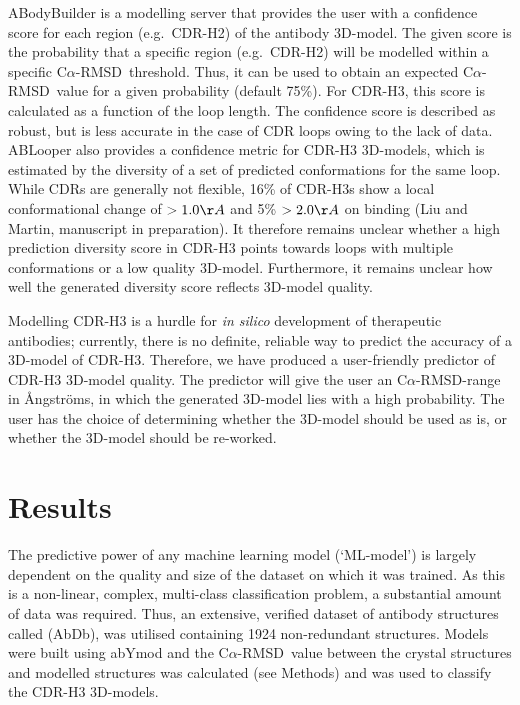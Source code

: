 \documentclass[12pt]{article}
\newcommand{\carmsd}{\mbox{C$\alpha$-RMSD}}
\begin{document}
ABodyBuilder is a modelling server that provides the user with a
confidence score for each region (e.g.\ CDR-H2) of the antibody
3D-model. The given score is the probability that a specific region
(e.g.\ CDR-H2) will be modelled within a specific \carmsd\
threshold\cite{Leem2016}. Thus, it can be used to obtain an expected
\carmsd\ value for a given probability (default 75\%). For CDR-H3, this
score is calculated as a function of the loop length.  The confidence
score is described as robust, but is less accurate in the case of CDR
loops owing to the lack of data\cite{Leem2016}. ABLooper also provides a
confidence metric for CDR-H3 3D-models, which is estimated by the
diversity of a set of predicted conformations for the same
loop\cite{Abanades2022}. While CDRs are generally not flexible,
16\% of CDR-H3s show a local conformational change of $>1.0\AA$
and 5\% $>2.0\AA$ on binding (Liu and Martin, manuscript in preparation).
It therefore remains unclear whether a high
prediction diversity score in CDR-H3 points towards loops with multiple
conformations or a low quality 3D-model. Furthermore, it remains unclear
how well the generated diversity score reflects 3D-model
quality\cite{Abanades2022}.


Modelling CDR-H3 is a hurdle for \emph{in silico} development of
therapeutic antibodies; currently, there is no definite, reliable way
to predict the accuracy of a 3D-model of 
CDR-H3. Therefore, we have produced a
user-friendly predictor of CDR-H3 3D-model quality. The predictor will give
the user an \carmsd-range in {\AA}ngstr\"{o}ms, in which the generated 3D-model lies
with a high probability.
The user has the choice of
determining whether the 3D-model should be used as is, or
whether the 3D-model should be re-worked.

\section{Results}

The predictive power of any machine learning model (`ML-model') is largely
dependent on the quality and size of the dataset on which it was trained. As
this is a non-linear, complex, multi-class classification problem, a
substantial amount of data was required. Thus, an extensive, verified
dataset of antibody structures called (AbDb\cite{Ferdous2018}),
was utilised containing 1924 non-redundant
structures. Models were built using abYmod and the \carmsd\ value
between the crystal structures
and modelled structures was calculated (see Methods) and
was used to classify the CDR-H3 3D-models.
\end{document}
